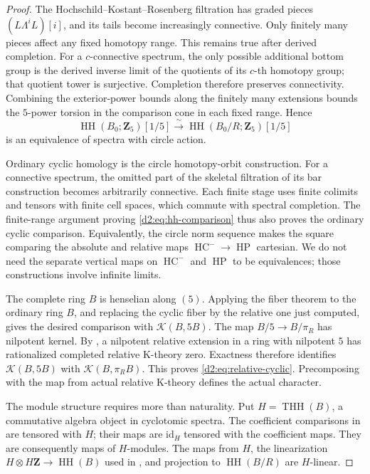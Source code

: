 \documentclass[11pt,a4paper]{amsart}
\numberwithin{equation}{section}
\theoremstyle{definition}
\theoremstyle{remark}
\newcommand{\DtwoZZ}{\mathbf{Z}}
\newcommand{\DtwocK}{\mathcal K}
\newcommand{\Dtwoid}{\mathrm{id}}
\DeclareMathOperator{\DtwoHH}{HH}
\DeclareMathOperator{\DtwoHC}{HC}
\DeclareMathOperator{\DtwoHP}{HP}
\DeclareMathOperator{\DtwoTHH}{THH}
\begin{document}
\begin{proof}
The Hochschild--Kostant--Rosenberg filtration has graded pieces
\((L\!\Lambda^iL)[i]\), and its tails become increasingly connective.
Only finitely many pieces affect any fixed homotopy range.
This remains true after derived completion.
For a \(c\)-connective spectrum, the only possible additional bottom
group is the derived inverse limit of the quotients of its
\(c\)-th homotopy group; that quotient tower is surjective.
Completion therefore preserves connectivity.
Combining the exterior-power bounds along the finitely many
extensions bounds the \(5\)-power torsion in the comparison cone in
each fixed range. Hence
\begin{equation}\label{d2:eq:hh-comparison}
 \DtwoHH(B_0;\DtwoZZ_5)[1/5]
 \xrightarrow{\ \sim\ }
 \DtwoHH(B_0/R;\DtwoZZ_5)[1/5]
\end{equation}
is an equivalence of spectra with circle action.

Ordinary cyclic homology is the circle homotopy-orbit construction.
For a connective spectrum, the omitted part of the skeletal
filtration of its bar construction becomes arbitrarily connective.
Each finite stage uses finite colimits and tensors with finite cell
spaces, which commute with spectral completion.
The finite-range argument proving \eqref{d2:eq:hh-comparison} thus
also proves the ordinary cyclic comparison.
Equivalently, the circle norm sequence makes the square comparing
the absolute and relative maps \(\DtwoHC^-\to\DtwoHP\) cartesian.
We do not need the separate vertical maps on \(\DtwoHC^-\) and \(\DtwoHP\)
to be equivalences; those constructions involve infinite limits.

The complete ring \(B\) is henselian along \((5)\).
Applying the fiber theorem to the ordinary ring \(B\), and replacing
the cyclic fiber by the relative one just computed, gives the desired
comparison with \(\DtwocK(B,5B)\).
The map \(B/5\to B/\pi_R\) has nilpotent kernel.
By \cite[Corollary~3.8]{AMMN}, a nilpotent relative extension in
a ring with nilpotent \(5\) has rationalized completed relative
K-theory zero. Exactness therefore identifies
\(\DtwocK(B,5B)\) with \(\DtwocK(B,\pi_RB)\).
This proves \eqref{d2:eq:relative-cyclic}.
Precomposing with the map from actual relative K-theory defines the
actual character.

The module structure requires more than naturality.
Put \(H=\DtwoTHH(B)\), a commutative algebra object in cyclotomic spectra.
The coefficient comparisons in
\cite[Proposition~2.8 and Corollary~2.10]{AMMN}
are tensored with \(H\); their maps are
\(\Dtwoid_H\) tensored with the coefficient maps.
They are consequently maps of \(H\)-modules.
The maps from \(H\), the linearization
\(H\otimes H\DtwoZZ\to\DtwoHH(B)\) used in
\cite[Theorem~2.12]{AMMN}, and projection to
\(\DtwoHH(B/R)\) are \(H\)-linear.


\end{proof}
\end{document}

